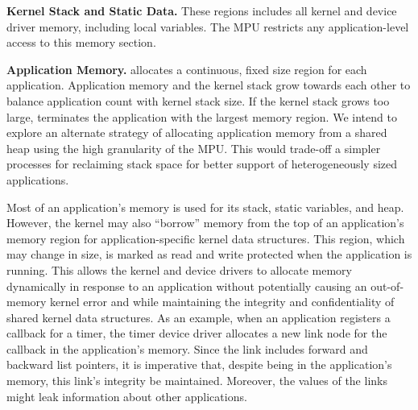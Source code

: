 {\bf Kernel Stack and Static Data.}
These regions includes all kernel and device driver memory, including local
variables. The MPU restricts any application-level access to this memory
section.

{\bf Application Memory.}
\name allocates a continuous, fixed size region for each
application.
Application memory and the kernel stack grow towards each other to balance
application count with kernel stack size. If the kernel stack
grows too large, \name terminates the application with the
largest memory region. We intend to explore an alternate strategy of
allocating application memory from a shared heap using the
high granularity of the MPU.
This would trade-off
a simpler processes for reclaiming stack space
for better support of heterogeneously sized applications.


Most of an
application's memory is
used for its stack, static variables, and heap. However,
the kernel may also ``borrow'' memory from the top of an application's memory
region for application-specific kernel data structures. This region, which may
change in size,
is marked
as read and write protected when the application is running. This allows the
kernel and device drivers to allocate memory dynamically in response to an
application without
potentially causing an out-of-memory kernel error and while
maintaining the integrity and
confidentiality of shared kernel data structures. As an example, when an
application registers a callback for a timer, the timer device driver
allocates a new link node for the callback in the application's memory.
Since the link includes forward and backward list
pointers, it is imperative that, despite being in the application's memory,
this link's integrity be maintained. Moreover, the values of the links might
leak information about other applications.


